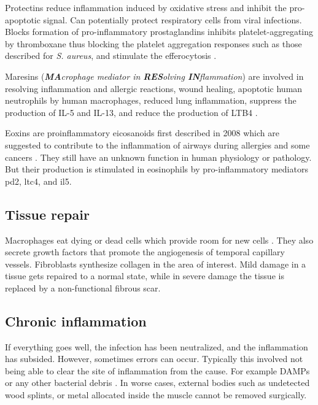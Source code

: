 Protectins reduce inflammation induced by oxidative stress and inhibit the pro-apoptotic signal. Can potentially protect respiratory cells from viral infections. Blocks formation of pro-inflammatory prostaglandins inhibits platelet-aggregating by thromboxane thus blocking the platelet aggregation responses such as those described for \textit{S. aureus}, and stimulate the efferocytosis \cite{Lagarde2014, Serhan2015}.

Maresins (\textit{\textbf{MA}crophage mediator in \textbf{RES}olving \textbf{IN}flammation}) are involved in resolving inflammation and allergic reactions, wound healing, apoptotic human neutrophils by human macrophages, reduced lung inflammation, suppress the production of IL-5 and IL-13, and reduce the production of LTB4 \cite{Serhan2013}.

Eoxins are proinflammatory eicosanoids first described in 2008 \cite{Feltenmark2008} which are suggested to contribute to the inflammation of airways during allergies and some cancers \cite{Claesson2009}. They still have an unknown function in human physiology or pathology. But their production is stimulated in eosinophils by pro-inflammatory mediators \gls{pd2}, \gls{ltc4}, and \gls{il5}.

\subsection{Tissue repair}

Macrophages eat dying or dead cells which provide room for new cells \cite{macrophages2022}. They also secrete growth factors that promote the angiogenesis of temporal capillary vessels. Fibroblasts synthesize collagen in the area of interest. Mild damage in a tissue gets repaired to a normal state, while in severe damage the tissue is replaced by a non-functional fibrous scar.

\subsection{Chronic inflammation}

If everything goes well, the infection has been neutralized, and the inflammation has subsided. However, sometimes errors can occur. Typically this involved not being able to clear the site of inflammation from the cause. For example DAMPs or any other bacterial debris \cite{chronicInfl2016}. In worse cases, external bodies such as undetected wood splints, or metal allocated inside the muscle cannot be removed surgically.

